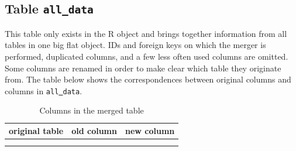 \documentclass[a4paper, 11pt]{book}
\newcommand{\und}{\underline{{ }}\hspace{0.2mm}}	%
\begin{document}
\subsection{Table \texttt{all\und data}}
\label{subsec:Table all_data}

This table only exists in the R object and brings together information from all tables in one big flat object. IDs and foreign keys on which the merger is performed, duplicated columns, and a few less often used columns are omitted. Some columns are renamed in order to make clear which table they originate from. The table below shows the correspondences between original columns and columns in \texttt{all\und data}. 

\begin{longtable}[ht!]{lll}
	\toprule
		\textbf{original table} & \textbf{old column} & \textbf{new column} \\
	\midrule
	\endhead
	
	\bottomrule\\[-0.15cm]
	\caption{Columns in the merged table}
	\endfoot
	

\end{longtable}
\end{document}

